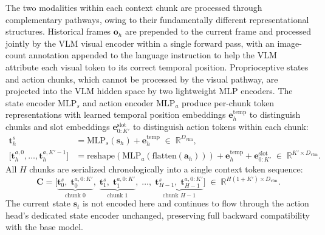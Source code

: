 The two modalities within each context chunk are processed through complementary pathways, owing to their fundamentally different representational structures. Historical frames $\mathbf{o}_h$ are prepended to the current frame and processed jointly by the VLM visual encoder within a single forward pass, with an image-count annotation appended to the language instruction to help the VLM attribute each visual token to its correct temporal position. Proprioceptive states and action chunks, which cannot be processed by the visual pathway, are projected into the VLM hidden space by two lightweight MLP encoders. The state encoder $\mathrm{MLP}_s$ and action encoder $\mathrm{MLP}_a$ produce per-chunk token representations with learned temporal position embeddings $\mathbf{e}_h^{\mathrm{temp}}$ to distinguish chunks and slot embeddings $\mathbf{e}_{0:K'}^{\mathrm{slot}}$ to distinguish action tokens within each chunk:
\begin{align}
    \mathbf{t}_h^s
        &= \mathrm{MLP}_s(\mathbf{s}_h)
           + \mathbf{e}_h^{\mathrm{temp}}
        \;\in\; \mathbb{R}^{D_\mathrm{vlm}},
    \label{eq:state_tok}\\
    \bigl[\mathbf{t}_h^{a,0},\ldots,\mathbf{t}_h^{a,K'-1}\bigr]
        &= \mathrm{reshape}\!\left(
             \mathrm{MLP}_a\!\left(\mathrm{flatten}(\mathbf{a}_h)\right)
           \right)
           + \mathbf{e}_h^{\mathrm{temp}}
           + \mathbf{e}_{0:K'}^{\mathrm{slot}}
        \;\in\; \mathbb{R}^{K' \times D_\mathrm{vlm}}.
    \label{eq:action_tok}
\end{align}
All $H$ chunks are serialized chronologically into a single context token sequence:
\begin{equation}
    \mathbf{C} = \bigl[
        \underbrace{\mathbf{t}_0^s,\;\mathbf{t}_0^{a,0{:}K'}}_{\text{chunk }0},\;
        \underbrace{\mathbf{t}_1^s,\;\mathbf{t}_1^{a,0{:}K'}}_{\text{chunk }1},\;
        \ldots,\;
        \underbrace{\mathbf{t}_{H-1}^s,\;\mathbf{t}_{H-1}^{a,0{:}K'}}_{\text{chunk }H-1}
    \bigr]
    \;\in\; \mathbb{R}^{H(1+K') \times D_\mathrm{vlm}}.
    \label{eq:ctx_seq}
\end{equation}
The current state $\mathbf{s}_t$ is not encoded here and continues to flow through the action head's dedicated state encoder unchanged, preserving full backward compatibility with the base \ours{} model.

